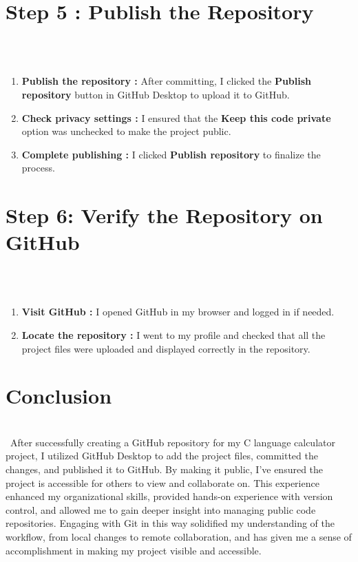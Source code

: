 \documentclass[12pt, a4paper]{article}
\begin{document}
\section*{Step 5 : Publish the Repository}
\\\
\begin{enumerate}
 \item \textbf{Publish the repository :} After committing, I clicked the \textbf{Publish repository} button in GitHub Desktop to upload it to GitHub.
    \item \textbf{Check privacy settings :} I ensured that the \textbf{Keep this code private} option was unchecked to make the project public.
    \item \textbf{Complete publishing :} I clicked \textbf{Publish repository} to finalize the process.

\end{enumerate}

\section*{Step 6: Verify the Repository on GitHub}
\\\
\begin{enumerate}
     \item \textbf{Visit GitHub :} I opened GitHub in my browser and logged in if needed.
    \item \textbf{Locate the repository :} I went to my profile and checked that all the project files were uploaded and displayed correctly in the repository.

\end{enumerate}


\section*{Conclusion}
\\\
After successfully creating a GitHub repository for my C language calculator project, I utilized GitHub Desktop to add the project files, committed the changes, and published it to GitHub. By making it public, I’ve ensured the project is accessible for others to view and collaborate on. This experience enhanced my organizational skills, provided hands-on experience with version control, and allowed me to gain deeper insight into managing public code repositories. Engaging with Git in this way solidified my understanding of the workflow, from local changes to remote collaboration, and has given me a sense of accomplishment in making my project visible and accessible.
\newpage
{}%
\vspace{-2cm}
\end{document}
